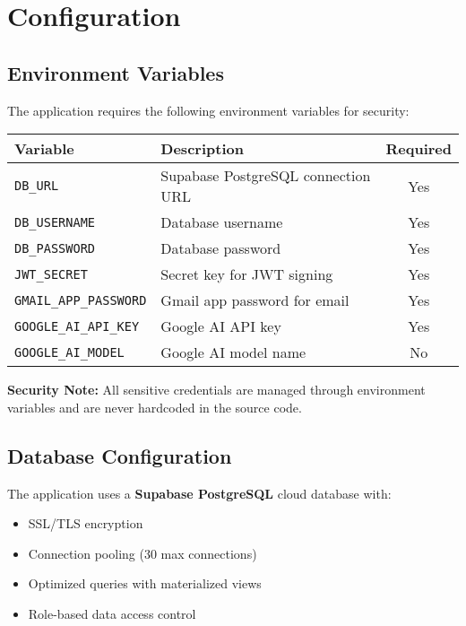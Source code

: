 \documentclass[11pt,a4paper]{article}
\begin{document}
\newpage

\section{Configuration}

\subsection{Environment Variables}

The application requires the following environment variables for security:

\begin{longtable}{|l|p{6cm}|c|}
\hline
\textbf{Variable} & \textbf{Description} & \textbf{Required} \\
\hline
\endhead
\texttt{DB\_URL} & Supabase PostgreSQL connection URL & Yes \\
\hline
\texttt{DB\_USERNAME} & Database username & Yes \\
\hline
\texttt{DB\_PASSWORD} & Database password & Yes \\
\hline
\texttt{JWT\_SECRET} & Secret key for JWT signing & Yes \\
\hline
\texttt{GMAIL\_APP\_PASSWORD} & Gmail app password for email & Yes \\
\hline
\texttt{GOOGLE\_AI\_API\_KEY} & Google AI API key & Yes \\
\hline
\texttt{GOOGLE\_AI\_MODEL} & Google AI model name & No \\
\hline
\end{longtable}

\textbf{Security Note:} All sensitive credentials are managed through environment variables and are never hardcoded in the source code.

\subsection{Database Configuration}

The application uses a \textbf{Supabase PostgreSQL} cloud database with:
\begin{itemize}[leftmargin=*]
    \item SSL/TLS encryption
    \item Connection pooling (30 max connections)
    \item Optimized queries with materialized views
    \item Role-based data access control
\end{itemize}
\end{document}
